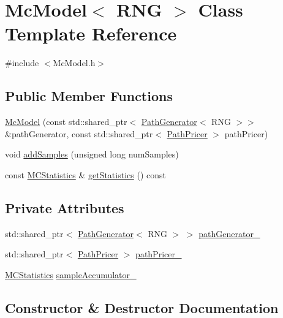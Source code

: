 \hypertarget{class_mc_model}{}\section{Mc\+Model$<$ R\+NG $>$ Class Template Reference}
\label{class_mc_model}


{\ttfamily \#include $<$Mc\+Model.\+h$>$}

\subsection*{Public Member Functions}
\begin{DoxyCompactItemize}
\item 
\hyperlink{class_mc_model_aeb469e49833dce6d5ffecfb31bcd0714}{Mc\+Model} (const std\+::shared\+\_\+ptr$<$ \hyperlink{class_path_generator}{Path\+Generator}$<$ R\+NG $>$$>$ \&path\+Generator, const std\+::shared\+\_\+ptr$<$ \hyperlink{class_path_pricer}{Path\+Pricer} $>$ path\+Pricer)
\item 
void \hyperlink{class_mc_model_a9ed7099395a0eae21fd3b719fab6b9de}{add\+Samples} (unsigned long num\+Samples)
\item 
const \hyperlink{class_m_c_statistics}{M\+C\+Statistics} \& \hyperlink{class_mc_model_afb59f4097bca3e5c22920cec8ce8b80f}{get\+Statistics} () const
\end{DoxyCompactItemize}
\subsection*{Private Attributes}
\begin{DoxyCompactItemize}
\item 
std\+::shared\+\_\+ptr$<$ \hyperlink{class_path_generator}{Path\+Generator}$<$ R\+NG $>$ $>$ \hyperlink{class_mc_model_ae583ee693ceb83b83593f15e2e5e371e}{path\+Generator\+\_\+}
\item 
std\+::shared\+\_\+ptr$<$ \hyperlink{class_path_pricer}{Path\+Pricer} $>$ \hyperlink{class_mc_model_a0936370baabb19be59052f108733279d}{path\+Pricer\+\_\+}
\item 
\hyperlink{class_m_c_statistics}{M\+C\+Statistics} \hyperlink{class_mc_model_a8fd3f9f39a642cbb8fd0f7fb3c18f919}{sample\+Accumulator\+\_\+}
\end{DoxyCompactItemize}


\subsection{Constructor \& Destructor Documentation}
\hypertarget{class_mc_model_aeb469e49833dce6d5ffecfb31bcd0714}{}\label{class_mc_model_aeb469e49833dce6d5ffecfb31bcd0714} 
